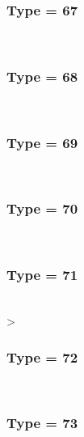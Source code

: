 \documentclass{article}
\begin{document}
        
        
            \subsubsection*{Type = 67}    
            
            \\
        
        
        
            \subsubsection*{Type = 68}    
            
            \\
        
        
        
            \subsubsection*{Type = 69}    
            
            \\
        
        
        
            \subsubsection*{Type = 70}    
            
            \\
        
        
        
            \subsubsection*{Type = 71}    
            
            \\
        
        >
        
            \subsubsection*{Type = 72}    
            
            \\
        
        
        
            \subsubsection*{Type = 73}    
            
\end{document}
